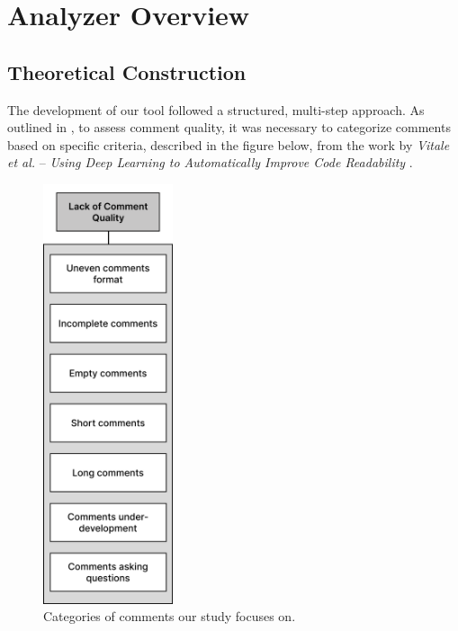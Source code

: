 
\chapter{Analyzer Overview} %

\label{Chapter3}

\section{Theoretical Construction}
The development of our tool followed a structured, multi-step approach. As outlined in , to assess comment quality, it was necessary to categorize comments based on specific criteria, described in the figure below, from the work by \textit{Vitale et al.} -- \textit{Using Deep Learning to Automatically Improve Code Readability} \cite{dlCR}.

\begin{figure}[ht]
	\centering\includegraphics[height=350pt]{figs/goal-schema.PNG}
	\captionsetup{justification=centering}
	\caption{Categories of comments our study focuses on.}
	\label{fig:goal-schema}
\end{figure}

